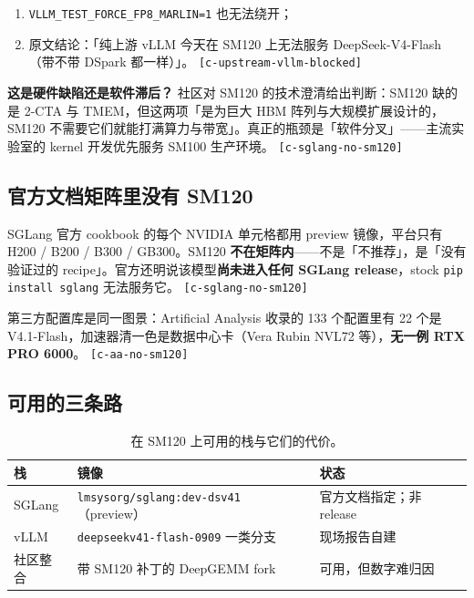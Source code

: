 \begin{enumerate}
  \item \texttt{VLLM\_TEST\_FORCE\_FP8\_MARLIN=1} 也无法绕开；
  \item 原文结论：「纯上游 vLLM 今天在 SM120 上无法服务 DeepSeek-V4-Flash（带不带 DSpark 都一样）」。 {\scriptsize\texttt{[c-\hspace{0pt}upstream-\hspace{0pt}vllm-\hspace{0pt}blocked]}}
\end{enumerate}

\textbf{这是硬件缺陷还是软件滞后？} 社区对 SM120 的技术澄清给出判断：SM120 缺的是 2-CTA 与 TMEM，但这两项「是为巨大 HBM 阵列与大规模扩展设计的，SM120 不需要它们就能打满算力与带宽」。真正的瓶颈是「软件分叉」——主流实验室的 kernel 开发优先服务 SM100 生产环境。 {\scriptsize\texttt{[c-\hspace{0pt}sglang-\hspace{0pt}no-\hspace{0pt}sm120]}}


\subsection{官方文档矩阵里没有 SM120}

SGLang 官方 cookbook 的每个 NVIDIA 单元格都用 preview 镜像，平台只有 H200 / B200 / B300 / GB300。SM120 \textbf{不在矩阵内}——不是「不推荐」，是「没有验证过的 recipe」。官方还明说该模型\textbf{尚未进入任何 SGLang release}，stock \texttt{pip\allowbreak{} install\allowbreak{} sglang} 无法服务它。 {\scriptsize\texttt{[c-\hspace{0pt}sglang-\hspace{0pt}no-\hspace{0pt}sm120]}}


第三方配置库是同一图景：Artificial Analysis 收录的 133 个配置里有 22 个是 V4.1-Flash，加速器清一色是数据中心卡（Vera Rubin NVL72 等），\textbf{无一例 RTX PRO 6000}。 {\scriptsize\texttt{[c-\hspace{0pt}aa-\hspace{0pt}no-\hspace{0pt}sm120]}}


\subsection{可用的三条路}

\begin{table}[t]
\centering
\footnotesize
\setlength{\tabcolsep}{4pt}
\caption{在 SM120 上可用的栈与它们的代价。}
\label{tab:5}
\begin{tabularx}{\textwidth}{lXl}
\toprule
栈 & 镜像 & 状态 \\
\midrule
SGLang & \texttt{lmsysorg/sglang:dev-\allowbreak{}dsv41}（preview） & 官方文档指定；非 release \\
vLLM & \texttt{deepseekv41-\allowbreak{}flash-\allowbreak{}0909} 一类分支 & 现场报告自建 \\
社区整合 & 带 SM120 补丁的 DeepGEMM fork & 可用，但数字难归因 \\
\bottomrule
\end{tabularx}
\end{table}

